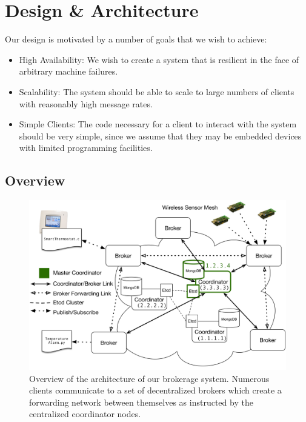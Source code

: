 \section{Design \& Architecture} %


Our design is motivated by a number of goals that we wish to achieve:
\begin{itemize}
\item High Availability: We wish to create a system that is resilient in the face of arbitrary machine failures.
\item Scalability: The system should be able to scale to large numbers of clients with reasonably high message rates.
\item Simple Clients: The code necessary for a client to interact with the system should be very simple, since we assume that they may be embedded devices with limited programming facilities.
\end{itemize}

\subsection{Overview}

\begin{figure}[t]
\centering
\includegraphics[width=6.5in]{figs/full_architecture.pdf}
\caption{Overview of the architecture of our brokerage system.
Numerous clients communicate to a set of decentralized brokers which create a forwarding network between themselves as instructed by the centralized coordinator nodes.}
\label{fig:architecture}
\end{figure}

